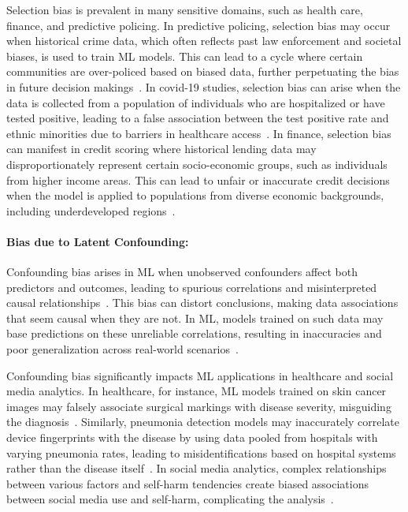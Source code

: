 \documentclass[11pt]{article}
\begin{document}
\vspace{-.2cm}
\begin{example}\label{ex:selection-bias-sensitive-domains}
Selection bias is prevalent in many sensitive domains, such as health care, finance, and predictive policing.
In predictive policing, selection bias may occur when historical crime data, which often reflects past law enforcement and societal biases, is used to train ML models. This can lead to a cycle where certain communities are over-policed based on biased data, further perpetuating the bias in future decision makings~\cite{brayne2015predictive,lum2016predict}. 
In covid-19 studies, selection bias can arise when the data is collected from a population of individuals who are hospitalized or have tested positive, leading to a false association between the test positive rate and ethnic minorities due to barriers in healthcare access~\cite{griffith2020collider}.
In finance, selection bias can manifest in credit scoring where historical lending data may disproportionately represent certain socio-economic groups, such as individuals from higher income areas. This can lead to unfair or inaccurate credit decisions when the model is applied to populations from diverse economic backgrounds, including underdeveloped regions~\cite{banasik2003sample, verstraeten2005impact}. 
\end{example}

\vspace{-.3cm}
\paragraph{Bias due to Latent Confounding:} Confounding bias arises in ML when unobserved confounders affect both predictors and outcomes, leading to spurious correlations and misinterpreted causal relationships~\cite{pearl2009causality}. This bias can distort conclusions, making data associations that seem causal when they are not. In ML, models trained on such data may base predictions on these unreliable correlations, resulting in inaccuracies and poor generalization across real-world scenarios~\cite{arjovsky2019invariant,yarkoni2022generalizability,hu2022improving}.

\vspace{-.1cm}
\begin{example}\label{ex:confounding}
Confounding bias significantly impacts ML applications in healthcare and social media analytics. In healthcare, for instance, ML models trained on skin cancer images may falsely associate surgical markings with disease severity, misguiding the diagnosis~\cite{winkler2019association,esteva2017dermatologist}. Similarly, pneumonia detection models may inaccurately correlate device fingerprints with the disease by using data pooled from hospitals with varying pneumonia rates, leading to misidentifications based on hospital systems rather than the disease itself~\cite{zech2018variable}. In social media analytics, complex relationships between various factors and self-harm tendencies create biased associations between social media use and self-harm, complicating the analysis~\cite{tormoen2023nationwide}.
\end{example}
\end{document}

